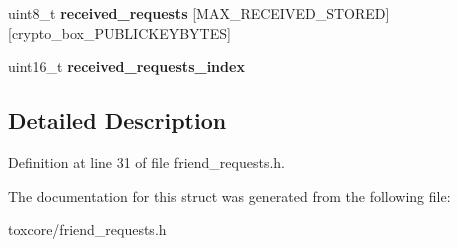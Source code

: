 \begin{DoxyCompactItemize}
\item 
\hypertarget{struct_friend___requests_a68ddfbf4a697f40962f07c5608f394cf}{uint8\+\_\+t {\bfseries received\+\_\+requests} \mbox{[}M\+A\+X\+\_\+\+R\+E\+C\+E\+I\+V\+E\+D\+\_\+\+S\+T\+O\+R\+E\+D\mbox{]}\mbox{[}crypto\+\_\+box\+\_\+\+P\+U\+B\+L\+I\+C\+K\+E\+Y\+B\+Y\+T\+E\+S\mbox{]}}\label{struct_friend___requests_a68ddfbf4a697f40962f07c5608f394cf}

\item 
\hypertarget{struct_friend___requests_a0e318c112b35d57bd44f5a47b9e3f680}{uint16\+\_\+t {\bfseries received\+\_\+requests\+\_\+index}}\label{struct_friend___requests_a0e318c112b35d57bd44f5a47b9e3f680}

\end{DoxyCompactItemize}


\subsection{Detailed Description}


Definition at line 31 of file friend\+\_\+requests.\+h.



The documentation for this struct was generated from the following file\+:\begin{DoxyCompactItemize}
\item 
toxcore/friend\+\_\+requests.\+h\end{DoxyCompactItemize}
